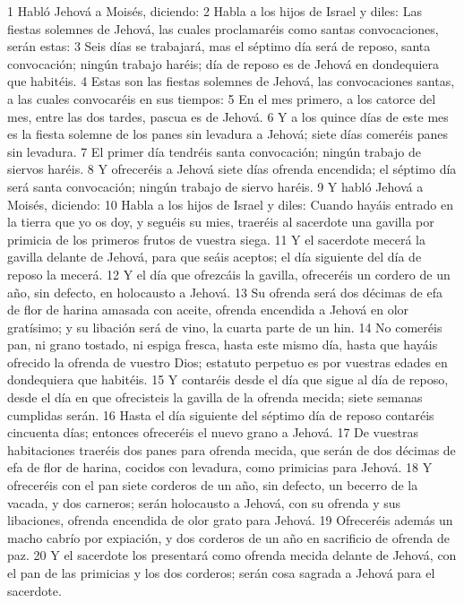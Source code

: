 1 Habló Jehová a Moisés, diciendo:
2 Habla a los hijos de Israel y diles: Las fiestas solemnes de Jehová, las cuales proclamaréis como santas convocaciones, serán estas:
3 Seis días se trabajará, mas el séptimo día será de reposo, santa convocación; ningún trabajo haréis; día de reposo es de Jehová en dondequiera que habitéis.
4 Estas son las fiestas solemnes de Jehová, las convocaciones santas, a las cuales convocaréis en sus tiempos:
5 En el mes primero, a los catorce del mes, entre las dos tardes, pascua es de Jehová.
6 Y a los quince días de este mes es la fiesta solemne de los panes sin levadura  a Jehová; siete días comeréis panes sin levadura.
7 El primer día tendréis santa convocación; ningún trabajo de siervos haréis.
8 Y ofreceréis a Jehová siete días ofrenda encendida; el séptimo día será santa convocación; ningún trabajo de siervo haréis.
9 Y habló Jehová a Moisés, diciendo:
10 Habla a los hijos de Israel y diles: Cuando hayáis entrado en la tierra que yo os doy, y seguéis su mies, traeréis al sacerdote una gavilla por primicia de los primeros frutos de vuestra siega.
11 Y el sacerdote mecerá la gavilla delante de Jehová, para que seáis aceptos; el día siguiente del día de reposo la mecerá.
12 Y el día que ofrezcáis la gavilla, ofreceréis un cordero de un año, sin defecto, en holocausto a Jehová.
13 Su ofrenda será dos décimas de efa   de flor de harina amasada con aceite, ofrenda encendida a Jehová en olor gratísimo; y su libación será de vino, la cuarta parte de un hin.
14 No comeréis pan, ni grano tostado, ni espiga fresca, hasta este mismo día, hasta que hayáis ofrecido la ofrenda de vuestro Dios; estatuto perpetuo es por vuestras edades en dondequiera que habitéis.
15 Y contaréis desde el día que sigue al día de reposo, desde el día en que ofrecisteis la gavilla de la ofrenda mecida; siete semanas cumplidas serán.
16 Hasta el día siguiente del séptimo día de reposo contaréis cincuenta días; entonces ofreceréis el nuevo grano a Jehová.
17 De vuestras habitaciones traeréis dos panes para ofrenda mecida, que serán de dos décimas de efa   de flor de harina, cocidos con levadura, como primicias para Jehová.
18 Y ofreceréis con el pan siete corderos de un año, sin defecto, un becerro de la vacada, y dos carneros; serán holocausto a Jehová, con su ofrenda y sus libaciones, ofrenda encendida de olor grato para Jehová.
19 Ofreceréis además un macho cabrío por expiación, y dos corderos de un año en sacrificio de ofrenda de paz.
20 Y el sacerdote los presentará como ofrenda mecida delante de Jehová, con el pan de las primicias y los dos corderos; serán cosa sagrada a Jehová para el sacerdote.
